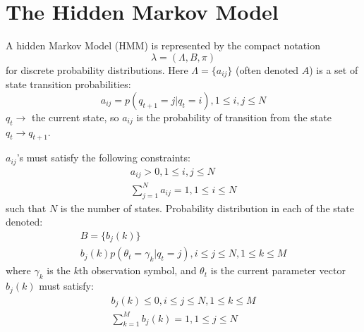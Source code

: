 \documentclass[11pt]{article}
\begin{document}
\section{The Hidden Markov Model}
A hidden Markov Model (HMM) is represented by the compact notation 
\begin{equation}
\lambda = ( \Lambda, B, \pi)
\end{equation}
for discrete probability distributions.  Here $\Lambda = \{ a_{ij} \} $ (often denoted $A$) is a set of state transition probabilities:  
\begin{equation}
a_{ij} = p ( q_{t+1} = j | q_t = i) , 1 \le i,j \le N
\end{equation}
$q_t \to$ the current state, so $a_{ij}$ is the probability of transition from the state $q_t \to q_{t+1}$.  

$a_{ij}$'s must satisfy the following constraints:
\begin{eqnarray}
	a_{ij} > 0 , 1 \le i, j \le N \\
	\sum_{j=1} ^N a_{ij} =1 , 1 \le i \le N
\end{eqnarray}
such that $N$ is the number of states.  Probability distribution in each of the state denoted:
\begin{eqnarray}
	B = \{ b_j (k)  \} \\
	b_j (k ) p( \theta_t = \gamma _k | q_t = j) , i \le j \le N , 1 \le k \le M 
\end{eqnarray}
where $\gamma_k$ is the $k$th observation symbol, and $\theta_t$ is the current parameter vector $b_j(k)$ must satisfy:
\begin{eqnarray}
	b_j (k) \le 0 , i \le j \le N, 1 \le k \le M \\ 
	\sum _{k=1}^M b_j (k) = 1 , 1 \le j \le N 
\end{eqnarray}
\end{document}
